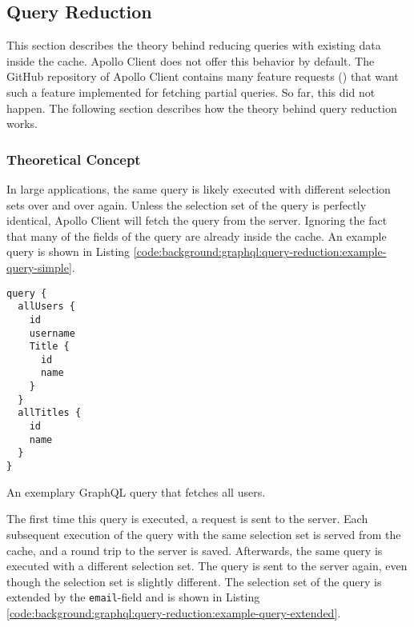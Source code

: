 \subsection{Query Reduction}\label{subsection:background:graphql:query-reduction}

This section describes the theory behind reducing queries with existing data inside the cache. Apollo Client does not offer this behavior by default. The GitHub repository of Apollo Client contains many feature requests (\cite{misc:-:background:graphql:feature-request-apollo:1, misc:-:background:graphql:feature-request-apollo:2, misc:-:background:graphql:feature-request-apollo:3, misc:-:background:graphql:feature-request-apollo:4}) that want such a feature implemented for fetching partial queries. So far, this did not happen. The following section describes how the theory behind query reduction works.

\subsubsection{Theoretical Concept}\label{subsubsection:background:graphql:theoretical-concept}

In large applications, the same query is likely executed with different selection sets over and over again. Unless the selection set of the query is perfectly identical, Apollo Client will fetch the query from the server. Ignoring the fact that many of the fields of the query are already inside the cache. An example query is shown in Listing  \ref{code:background:graphql:query-reduction:example-query-simple}.

\ifshowListings
\begin{listing}[H]
    \begin{verbatim}
query {
  allUsers {
    id
    username
    Title {
      id
      name
    }
  }
  allTitles {
    id
    name
  }
}
    \end{verbatim}
    \caption{An exemplary GraphQL query that fetches all users.}\label{code:background:graphql:query-reduction:example-query-simple}
\end{listing}
\fi

\noindent The first time this query is executed, a request is sent to the server. Each subsequent execution of the query with the same selection set is served from the cache, and a round trip to the server is saved. Afterwards, the same query is executed with a different selection set. The query is sent to the server again, even though the selection set is slightly different. The selection set of the query is extended by the \texttt{email}-field and is shown in Listing \ref{code:background:graphql:query-reduction:example-query-extended}.

